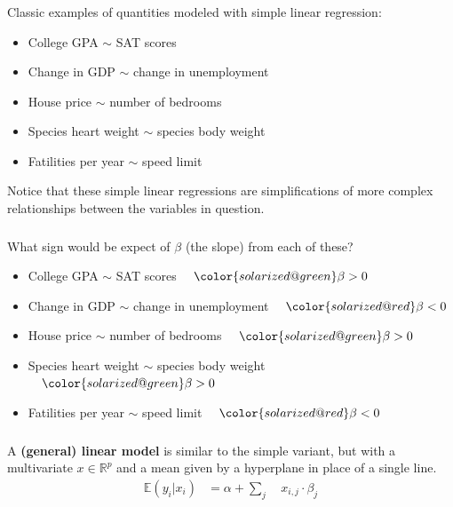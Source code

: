 \begin{frame}[fragile] \frametitle{}

Classic examples of quantities modeled with simple linear regression:
\begin{itemize}
\item College GPA $\sim$ SAT scores
\item Change in GDP $\sim$ change in unemployment
\item House price $\sim$ number of bedrooms
\item Species heart weight $\sim$ species body weight
\item Fatilities per year $\sim$ speed limit
\end{itemize}

\pause
Notice that these simple linear regressions are simplifications of
more complex relationships between the variables in question.

\end{frame}

\begin{frame}[fragile] \frametitle{}

What sign would be expect of $\beta$ (the slope) from
each of these?
\begin{itemize}
\item College GPA $\sim$ SAT scores \pause  $\quad{\color{solarized@green} \beta > 0}$
\item Change in GDP $\sim$ change in unemployment \pause $\quad{\color{solarized@red}\beta < 0}$
\item House price $\sim$ number of bedrooms \pause $\quad{\color{solarized@green}\beta > 0}$
\item Species heart weight $\sim$ species body weight \pause $\quad{\color{solarized@green}\beta > 0}$
\item Fatilities per year $\sim$ speed limit \pause $\quad{\color{solarized@red}\beta < 0}$
\end{itemize}

\end{frame}

\begin{frame}[fragile] \frametitle{}

A {\bf (general) linear model} is similar to the simple variant, but
with a multivariate $x \in \mathbb{R}^p$ and a mean given by a hyperplane
in place of a single line.
\begin{align}
\mathbb{E}(y_i|x_i) &= \alpha + \sum_j \quad x_{i,j} \cdot \beta_j
\end{align}

\end{frame}

